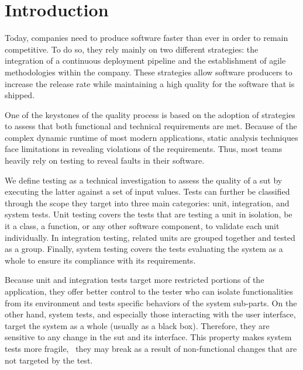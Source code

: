 \chapter{Introduction}
\label{chap:introduction}


Today, companies need to produce software faster than ever in order to remain competitive. To do so, they rely mainly on two different strategies: the integration of a continuous deployment pipeline and the establishment of agile methodologies within the company. These strategies allow software producers to increase the release rate while maintaining a high quality for the software that is shipped.

One of the keystones of the quality process is based on the adoption of strategies to assess that both functional and technical requirements are met. Because of the complex dynamic runtime of most modern applications, static analysis techniques face limitations in revealing violations of the requirements. Thus, most teams heavily rely on testing to reveal faults in their software. 

We define testing as a technical investigation to assess the quality of a \gls{sut} by executing the latter against a set of input values. Tests can further be classified through the scope they target into three main categories: unit, integration, and system tests. Unit testing covers the tests that are testing a unit in isolation, be it a class, a function, or any other software component,  to validate each unit individually. In integration testing, related units are grouped together and tested as a group. Finally, system testing covers the tests evaluating the system as a whole to ensure its compliance with its requirements.

Because unit and integration tests target more restricted portions of the application, they offer better control to the tester who can isolate functionalities from its environment and tests specific behaviors of the system sub-parts. On the other hand, system tests, and especially those interacting with the user interface, target the system as a whole (usually as a black box). Therefore, they are sensitive to any change in the \gls{sut} and its interface. This property makes system tests more fragile, \ie\ they may break as a result of non-functional changes that are not targeted by the test.

